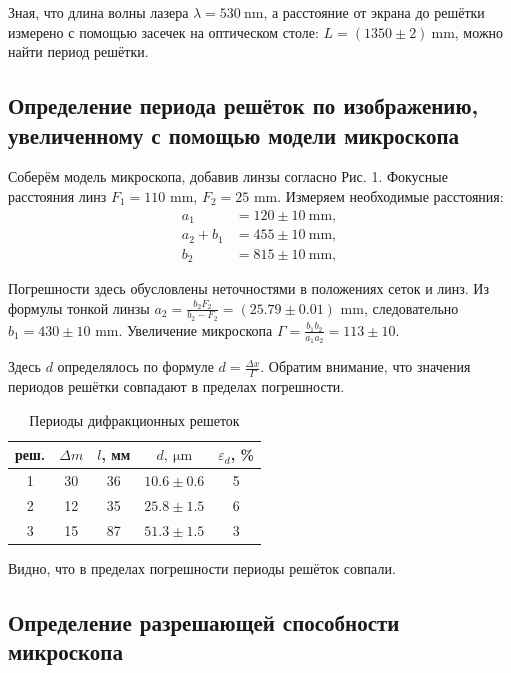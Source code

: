 \documentclass[12pt, a4paper]{article}
\begin{document}
Зная, что длина волны лазера $\lambda = 530~\mathrm{nm}$, а расстояние от
экрана до решётки измерено с помощью засечек на оптическом столе: $L = (1350\pm
    2)~\mathrm{mm}$, можно найти период решётки.

\subsection{Определение периода решёток по изображению, увеличенному с помощью
    модели микроскопа}

Соберём модель микроскопа, добавив линзы согласно Рис. 1. Фокусные расстояния
линз $F_{1}= 110$ mm, $F_{2}= 25$ mm. Измеряем необходимые расстояния: $$
    \begin{aligned}
        a_{1}       & = 120  \pm 10~\mathrm{mm}, \\
        a_{2}+b_{1} & = 455 \pm 10~\mathrm{mm},  \\
        b_{2}       & = 815 \pm 10~\mathrm{mm},
    \end{aligned}
$$

Погрешности здесь обусловлены неточностями в положениях сеток и линз. Из
формулы тонкой линзы $a_{2}=\frac{b_{2} F_{2}}{b_{2}-F_{2}}=(25.79\pm 0.01)$
mm, следовательно $b_{1}= 430\pm 10$ mm. Увеличение микроскопа $
    \Gamma=\frac{b_{1} b_{2}}{a_{1} a_{2}}=113 \pm 10$.

Здесь $d$ определялось по формуле $d=\frac{\Delta x}{\Gamma}$. Обратим
внимание, что значения периодов решётки совпадают в пределах погрешности.
\begin{table}[H]
    \centering
    \begin{tabular}{|c|c|c|c|c|}
        \hline
        реш. & $\Delta m$ & $l$, мм & $d,~\mathrm{\mu m}$ & $\varepsilon_d$, \% \\ \hline
        1    & 30         & 36      & $10.6  \pm 0.6$     & 5                   \\ \hline
        2    & 12         & 35      & $25.8 \pm 1.5$      & 6                   \\ \hline
        3    & 15         & 87      & $51.3 \pm 1.5$      & 3                   \\ \hline
    \end{tabular}
    \caption{Периоды дифракционных решеток}
    \label{table:ampd}
\end{table}
Видно, что в пределах погрешности периоды решёток совпали.

\subsection{Определение разрешающей способности микроскопа}
\end{document}
